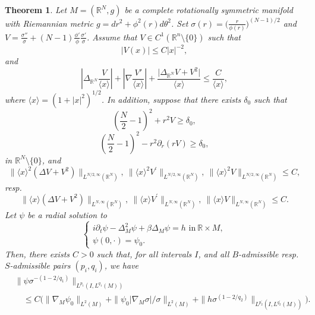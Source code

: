 \documentclass[10pt,leqno]{amsart}
\newtheorem{thm}{Theorem}[section]
\numberwithin{equation}{section}
\newcommand{\field}[1]{\mathbb{#1}}
\newcommand{\R}{\field{R}}          		%
\begin{document}
\begin{thm}
\label{thmexCH}
Let $M=(\R^N ,g)$ be a complete rotationally symmetric manifold with Riemannian metric $g= dr^2 + \phi^2 (r) d\theta^2$. Set $\sigma(r)= \big(\frac{r}{\phi (r)}\big)^{(N-1)/2}$ and $V=\frac{\sigma''}{\sigma}+(N-1)\frac{\phi'}{\phi}\frac{\sigma'}{\sigma} $.
Assume that $V\in C^1 (\R^n \setminus \{0\})$ such that
$$|V(x)|\leq C |x|^{-2},$$
and
\begin{equation*}
\left|\Delta_{\R^N} \frac{V}{\langle x\rangle}\right| +\left|\nabla\frac{V'}{\langle x\rangle}\right|+\dfrac{ \big| \Delta_{\R^N} V +V^2 \big|}{\langle x \rangle} \leq \frac{C}{\langle x \rangle},
\end{equation*}
where $\langle x \rangle =(1+|x|^2)^{1/2}$. In addition, suppose that there exists $\delta_0$ such that
\[
\left(\frac{N}{2} -1\right)^2 +r^2 V \geq \delta_0,
\]
\[
\left(\frac{N}{2} -1\right)^2 - r^2 \partial_r (rV) \geq \delta_0,
\]
in $\R^N \setminus \{0\}$, and
\begin{equation}
\label{mainCHass}
\|\langle x\rangle^2 (\Delta V+V^2) \|_{L^{N/2,\infty} (\R^N)},\  \|\langle x\rangle^2 V^\prime\|_{L^{N/2,\infty} (\R^N)},\ \|\langle x\rangle^2 V\|_{L^{N/2,\infty} (\R^N)}\leq C,
\end{equation}
resp.
\begin{equation}
\label{mainCHass2}
\|\langle x\rangle (\Delta V+V^2) \|_{L^{N,\infty} (\R^N)},\  \|\langle x\rangle V^\prime\|_{L^{N,\infty} (\R^N)},\ \|\langle x\rangle V\|_{L^{N,\infty} (\R^N)}\leq C.
\end{equation}
 Let $\psi$ be a radial solution to
$$\begin{cases}i\partial_t \psi-\Delta_M^2 \psi +\beta \Delta_M \psi= h\mbox{ in}\ \R \times M,\\ \psi(0,\cdot)=\psi_0.\end{cases}$$
Then, there exists $C>0$ such that, for all intervals $I$, and all $B$-admissible resp. $S$-admissible pairs $(p_i ,q_i)$, we have
\begin{align*}
&\big\|\psi \sigma^{-(1-2/q_1)}\big\|_{L^{p_1} (I, L^{q_1} (M)) }\\
&\quad \leq C \big(\|\nabla_{M} \psi_0\|_{L^2 (M)} +\|\psi_0 |\nabla_{M} \sigma|/\sigma \|_{L^2 (M)} + \|h \sigma^{(1- 2/q_2)} \|_{L^{p_2^\prime} (I, L^{q_2^\prime } (M))}  \big).
\end{align*}
\end{thm}
\end{document}
